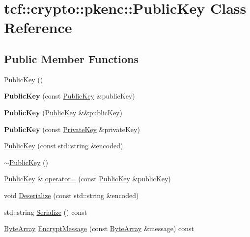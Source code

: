 \hypertarget{classtcf_1_1crypto_1_1pkenc_1_1PublicKey}{}\section{tcf\+:\+:crypto\+:\+:pkenc\+:\+:Public\+Key Class Reference}
\label{classtcf_1_1crypto_1_1pkenc_1_1PublicKey}
\subsection*{Public Member Functions}
\begin{DoxyCompactItemize}
\item 
\hyperlink{classtcf_1_1crypto_1_1pkenc_1_1PublicKey_ac4c8a9bba7b1f0dfb0018b37752493f4}{Public\+Key} ()
\item 
\mbox{\label{classtcf_1_1crypto_1_1pkenc_1_1PublicKey_a246f1a31850a9d2087e9c45cd35adbdd}} 
{\bfseries Public\+Key} (const \hyperlink{classtcf_1_1crypto_1_1pkenc_1_1PublicKey}{Public\+Key} \&public\+Key)
\item 
\mbox{\label{classtcf_1_1crypto_1_1pkenc_1_1PublicKey_a6f2ce02471bedecbd54a68cea1ee5dae}} 
{\bfseries Public\+Key} (\hyperlink{classtcf_1_1crypto_1_1pkenc_1_1PublicKey}{Public\+Key} \&\&public\+Key)
\item 
\mbox{\label{classtcf_1_1crypto_1_1pkenc_1_1PublicKey_a95c809f167fe1eb799ff892bc6195431}} 
{\bfseries Public\+Key} (const \hyperlink{classtcf_1_1crypto_1_1pkenc_1_1PrivateKey}{Private\+Key} \&private\+Key)
\item 
\hyperlink{classtcf_1_1crypto_1_1pkenc_1_1PublicKey_a12453c33a67dadce1fb29ca86cb5f4e7}{Public\+Key} (const std\+::string \&encoded)
\item 
\hyperlink{classtcf_1_1crypto_1_1pkenc_1_1PublicKey_a466c119581aae3efc3e9f2040e9f1ed3}{$\sim$\+Public\+Key} ()
\item 
\hyperlink{classtcf_1_1crypto_1_1pkenc_1_1PublicKey}{Public\+Key} \& \hyperlink{classtcf_1_1crypto_1_1pkenc_1_1PublicKey_a2dbd79b40f6b26d52c03a2d8f438d2c5}{operator=} (const \hyperlink{classtcf_1_1crypto_1_1pkenc_1_1PublicKey}{Public\+Key} \&public\+Key)
\item 
void \hyperlink{classtcf_1_1crypto_1_1pkenc_1_1PublicKey_ada0915154339efaaedc3487637f659eb}{Deserialize} (const std\+::string \&encoded)
\item 
std\+::string \hyperlink{classtcf_1_1crypto_1_1pkenc_1_1PublicKey_a8d719a04c643cfc4b6fb51c4574ce920}{Serialize} () const
\item 
\hyperlink{types_8h_a35da937e2331acce98d47f44892f4a76}{Byte\+Array} \hyperlink{classtcf_1_1crypto_1_1pkenc_1_1PublicKey_a31985a3c684b75d56539c50f3b1c4950}{Encrypt\+Message} (const \hyperlink{types_8h_a35da937e2331acce98d47f44892f4a76}{Byte\+Array} \&message) const
\end{DoxyCompactItemize}


